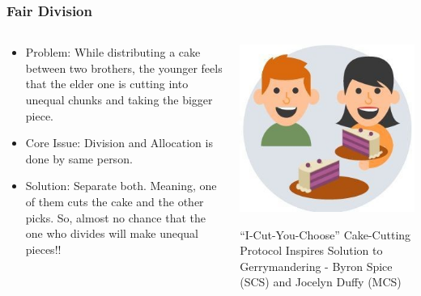 \begin{frame}[fragile]\frametitle{Fair Division}
\begin{columns}
    \begin{column}[T]{0.6\linewidth}
      \begin{itemize}
		\item Problem: While distributing a cake between two brothers, the younger feels that the elder one is cutting into unequal chunks and taking the bigger piece.
		\item Core Issue: Division and Allocation is done by same person.
		\item Solution: Separate both. Meaning, one of them cuts the cake and the other picks. So, almost no chance that the one who divides will make unequal pieces!!
	  \end{itemize}

    \end{column}
    \begin{column}[T]{0.4\linewidth}
		\begin{center}
		\includegraphics[width=0.8\linewidth,keepaspectratio]{images/game_theory_fair_division}
		
		{\small ``I-Cut-You-Choose'' Cake-Cutting Protocol Inspires Solution to Gerrymandering - 
Byron Spice (SCS) and Jocelyn Duffy (MCS)}
		\end{center}	
    \end{column}
  \end{columns}
\end{frame}














